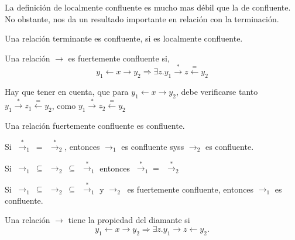 
La definición de localmente confluente es mucho mas débil que la de
confluente. No obstante, nos da un resultado importante en relación con la
terminación.


\begin{lema} 
  Una relación terminante es confluente, si es localmente confluente.
\end{lema}

\begin{defi}
  Una relación $\rightarrow$ es fuertemente confluente si,
  \[
    y_1 \leftarrow x \rightarrow y_2 \Rightarrow 
    \exists z.  y_1 \xrightarrow{*} z \xleftarrow{=} y_2
  \] 
\end{defi}

Hay que tener en cuenta, que para $y_1 \leftarrow x \rightarrow y_2$, debe
verificarse tanto $y_1 \xrightarrow{*} z_1 \xleftarrow{=} y_2$, como
$y_1 \xrightarrow{*} z_2 \xleftarrow{=} y_2$

\begin{lema} 
  Una relación fuertemente confluente es confluente.
\end{lema}

\begin{lema} 
  Si $ \ \xrightarrow{*}_1 \ = \ \ \xrightarrow{*}_2$, entonces $\rightarrow_1$
  es confluente syss $\rightarrow_2$ es confluente.
\end{lema}

\begin{lema}
  Si
  $ \ \rightarrow_1 \ \subseteq \ \ \rightarrow_2 \ \subseteq \ \
  \xrightarrow{*}_1 $ entonces $ \ \xrightarrow{*}_1 = \ \ \xrightarrow{*}_2$
\end{lema}

\begin{coro}
  Si
  $ \ \rightarrow_1 \ \subseteq \ \ \rightarrow_2 \ \subseteq \ \
  \xrightarrow{*}_1 $ y $\rightarrow_2 \ $ es fuertemente confluente, entonces
  $\rightarrow_1$ es confluente.
\end{coro}


\begin{defi}
  Una relación $\rightarrow$ tiene la propiedad del diamante si
  \[
    y_1 \leftarrow x \rightarrow y_2 \Rightarrow \exists z. y_1 \rightarrow z \leftarrow y_2. 
  \]
\end{defi} 

